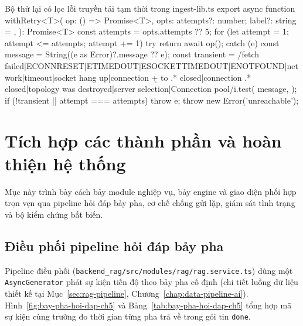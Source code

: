 \begin{tsbox}[minted options={fontsize=\small,breaklines=true,breakanywhere=true,linenos=true,numbersep=6pt,tabsize=2}]{Bộ thử lại có lọc lỗi truyền tải tạm thời trong ingest-lib.ts}
export async function withRetry<T>(
  op: () => Promise<T>,
  opts: { attempts?: number; label?: string } = {},
): Promise<T> {
  const attempts = opts.attempts ?? 5;
  for (let attempt = 1; attempt <= attempts; attempt += 1) {
    try {
      return await op();
    } catch (e) {
      const message = String((e as Error)?.message ?? e);
      const transient =
        /fetch failed|ECONNRESET|ETIMEDOUT|ESOCKETTIMEDOUT|ENOTFOUND|network|timeout|socket hang up|connection \d+ to .* closed|connection .* closed|topology was destroyed|server selection|Connection pool/i.test(
          message,
        );
      if (!transient || attempt === attempts) throw e;
    }
  }
  throw new Error('unreachable');
}
\end{tsbox}

\section{Tích hợp các thành phần và hoàn thiện hệ thống}
\label{sec:tich-hop-he-thong}

Mục này trình bày cách bảy module nghiệp vụ, bảy engine và giao diện phối hợp trọn vẹn qua pipeline hỏi đáp bảy pha, cơ chế chống gửi lặp, giám sát tình trạng và bộ kiểm chứng bất biến.

\subsection{Điều phối pipeline hỏi đáp bảy pha}
\label{subsec:dieu-phoi-bay-pha}

Pipeline điều phối (\texttt{backend\_\allowbreak{}rag/\allowbreak{}src/\allowbreak{}modules/\allowbreak{}rag/\allowbreak{}rag.\allowbreak{}service.\allowbreak{}ts}) dùng một \texttt{Async\allowbreak{}Generator} phát sự kiện tiến độ theo bảy pha cố định (chi tiết luồng dữ liệu thiết kế tại Mục~\ref{sec:rag-pipeline}, Chương~\ref{chap:data-pipeline-ai}). Hình~\ref{fig:bay-pha-hoi-dap-ch5} và Bảng~\ref{tab:bay-pha-hoi-dap-ch5} tổng hợp mã sự kiện cùng trường đo thời gian từng pha trả về trong gói tin \texttt{done}.

